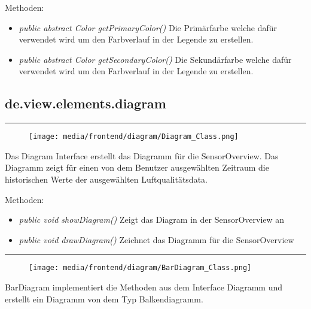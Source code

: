 Methoden:
\begin{itemize} 
    \item \emph{public abstract Color getPrimaryColor()} Die Primärfarbe welche dafür verwendet wird um den Farbverlauf in der Legende zu erstellen.
    \item \emph{public abstract Color getSecondaryColor()} Die Sekundärfarbe welche dafür verwendet wird um den Farbverlauf in der Legende zu erstellen.
\end{itemize}


\subsection{de.view.elements.diagram}

\rule{\textwidth}{0.4pt} 
\begin{minipage}{0.3\textwidth}
    \begin{figure}[H]
        \texttt{[image: media/frontend/diagram/Diagram\_Class.png]}
    \end{figure}
    \end{minipage} \hfill
    \begin{minipage}{0.6\textwidth}
Das Diagram Interface erstellt das Diagramm für die SensorOverview. Das Diagramm zeigt für einen von dem Benutzer ausgewählten Zeitraum die historischen Werte der ausgewählten Luftqualitätsdata.
\end{minipage}

Methoden:
\begin{itemize} 
    \item \emph{public void showDiagram()} Zeigt das Diagram in der SensorOverview an
    \item \emph{public void drawDiagram()} Zeichnet das Diagramm für die SensorOverview
\end{itemize}

\rule{\textwidth}{0.4pt} 
\begin{minipage}{0.3\textwidth}
    \begin{figure}[H]
        \texttt{[image: media/frontend/diagram/BarDiagram\_Class.png]}
    \end{figure}
    \end{minipage} \hfill
    \begin{minipage}{0.6\textwidth}
BarDiagram implementiert die Methoden aus dem Interface Diagramm und erstellt ein Diagramm von dem Typ Balkendiagramm.
\end{minipage}

